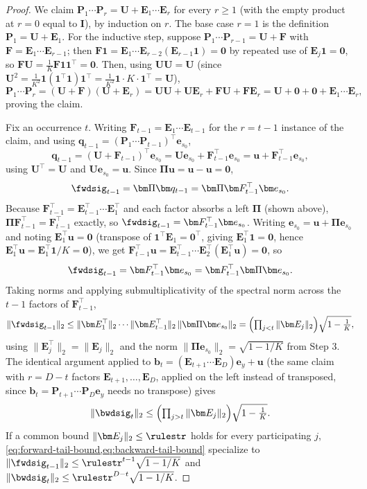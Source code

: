\begin{proof}
We claim $\bm{P}_1\cdots \bm{P}_r=\bm{U}+\bm{E}_1\cdots \bm{E}_r$ for every $r\ge1$
(with the empty product at $r=0$ equal to $\bm I$), by induction on $r$. The
base case $r=1$ is the definition $\bm P_1=\bm U+\bm E_1$. For the inductive
step, suppose $\bm P_1\cdots\bm P_{r-1}=\bm U+\bm F$ with
$\bm F=\bm E_1\cdots\bm E_{r-1}$; then $\bm F\mathbf1=\bm E_1\cdots\bm E_{r-2}(\bm E_{r-1}\mathbf1)=\bm0$
by repeated use of $\bm E_j\mathbf1=\bm0$, so $\bm F\bm U=\tfrac1K\bm F\mathbf1\mathbf1^\top=\bm0$.
Then, using $\bm U\bm U=\bm U$ (since $\bm U^2=\tfrac1{K^2}\mathbf1(\mathbf1^\top\mathbf1)\mathbf1^\top=\tfrac1{K^2}\mathbf1\cdot K\cdot\mathbf1^\top=\bm U$),
\[
 \bm P_1\cdots\bm P_r=(\bm U+\bm F)(\bm U+\bm E_r)
 =\bm U\bm U+\bm U\bm E_r+\bm F\bm U+\bm F\bm E_r
 =\bm U+\bm0+\bm0+\bm E_1\cdots\bm E_r,
\]
proving the claim.

Fix an occurrence $t$. Writing $\bm F_{t-1}=\bm E_1\cdots\bm E_{t-1}$ for the
$r=t-1$ instance of the claim, and using $\bm q_{t-1}=(\bm P_1\cdots\bm P_{t-1})^\top\bm e_{s_0}$,
\[
 \bm q_{t-1}=(\bm U+\bm F_{t-1})^\top\bm e_{s_0}=\bm U\bm e_{s_0}+\bm F_{t-1}^\top\bm e_{s_0}=\bm u+\bm F_{t-1}^\top\bm e_{s_0},
\]
using $\bm U^\top=\bm U$ and $\bm U\bm e_{s_0}=\bm u$. Since $\bm\Pi\bm u=\bm u-\bm u=\bm0$,
\[
 \fwdsig_{t-1}=\bm\Pi\bm q_{t-1}=\bm\Pi\bm F_{t-1}^\top\bm e_{s_0}.
\]
Because $\bm F_{t-1}^\top=\bm E_{t-1}^\top\cdots\bm E_1^\top$ and each factor
absorbs a left $\bm\Pi$ (shown above), $\bm\Pi\bm F_{t-1}^\top=\bm F_{t-1}^\top$
exactly, so $\fwdsig_{t-1}=\bm F_{t-1}^\top\bm e_{s_0}$. Writing
$\bm e_{s_0}=\bm u+\bm\Pi\bm e_{s_0}$ and noting
$\bm E_1^\top\bm u=\bm0$ (transpose of $\mathbf1^\top\bm E_1=\bm0^\top$, giving
$\bm E_1^\top\mathbf1=\bm0$, hence $\bm E_1^\top\bm u=\bm E_1^\top\mathbf1/K=\bm0$),
we get $\bm F_{t-1}^\top\bm u=\bm E_{t-1}^\top\cdots\bm E_2^\top(\bm E_1^\top\bm u)=\bm0$,
so
\[
 \fwdsig_{t-1}=\bm F_{t-1}^\top\bm e_{s_0}=\bm F_{t-1}^\top\bm\Pi\bm e_{s_0}.
\]
Taking norms and applying submultiplicativity of the spectral norm across
the $t-1$ factors of $\bm F_{t-1}^\top$,
\begin{equation}
 \|\fwdsig_{t-1}\|_2\le\|\bm E_1^\top\|_2\cdots\|\bm E_{t-1}^\top\|_2\,\|\bm\Pi\bm e_{s_0}\|_2
 =\Bigl(\textstyle\prod_{j<t}\|\bm E_j\|_2\Bigr)\sqrt{1-\tfrac1K},
 \label{eq:forward-tail-bound}
\end{equation}
using $\|\bm E_j^\top\|_2=\|\bm E_j\|_2$ and the norm
$\|\bm\Pi\bm e_{s_0}\|_2=\sqrt{1-1/K}$ from Step 3. The identical argument
applied to $\bm b_t=(\bm E_{t+1}\cdots\bm E_D)\bm e_y+\bm u$ (the same claim
with $r=D-t$ factors $\bm E_{t+1},\ldots,\bm E_D$, applied on the left instead
of transposed, since $\bm b_t=\bm P_{t+1}\cdots\bm P_D\bm e_y$ needs no
transpose) gives
\begin{equation}
 \|\bwdsig_t\|_2\le\Bigl(\textstyle\prod_{j>t}\|\bm E_j\|_2\Bigr)\sqrt{1-\tfrac1K}.
 \label{eq:backward-tail-bound}
\end{equation}
If a common bound $\|\bm E_j\|_2\le\rulestr$ holds for every participating
$j$, \cref{eq:forward-tail-bound,eq:backward-tail-bound} specialize to
$\|\fwdsig_{t-1}\|_2\le\rulestr^{t-1}\sqrt{1-1/K}$ and
$\|\bwdsig_t\|_2\le\rulestr^{D-t}\sqrt{1-1/K}$.


\end{proof}
